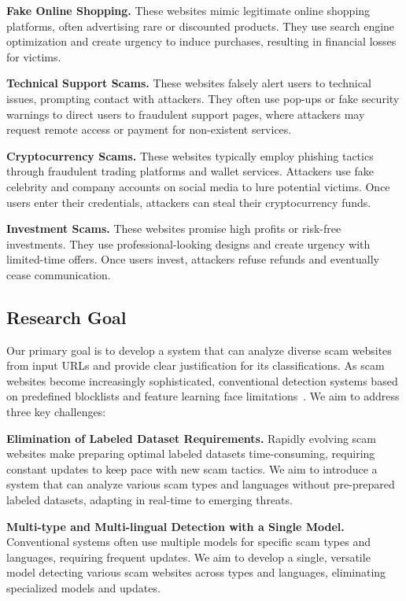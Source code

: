 \documentclass[runningheads]{llncs}
\begin{document}
\noindent\textbf{Fake Online Shopping.}
These websites mimic legitimate online shopping platforms, often advertising rare or discounted products.
They use search engine optimization and create urgency to induce purchases, resulting in financial losses for victims.

\noindent\textbf{Technical Support Scams.}
These websites falsely alert users to technical issues, prompting contact with attackers.
They often use pop-ups or fake security warnings to direct users to fraudulent support pages, where attackers may request remote access or payment for non-existent services.

\noindent\textbf{Cryptocurrency Scams.}
These websites typically employ phishing tactics through fraudulent trading platforms and wallet services.
Attackers use fake celebrity and company accounts on social media to lure potential victims.
Once users enter their credentials, attackers can steal their cryptocurrency funds.

\noindent\textbf{Investment Scams.}
These websites promise high profits or risk-free investments.
They use professional-looking designs and create urgency with limited-time offers.
Once users invest, attackers refuse refunds and eventually cease communication.

\subsection{Research Goal}
Our primary goal is to develop a system that can analyze diverse scam websites from input URLs and provide clear justification for its classifications.
As scam websites become increasingly sophisticated, conventional detection systems based on predefined blocklists and feature learning face limitations~\cite{DBLP:conf/ndss/LiYN23,DBLP:conf/www/SrinivasanKMANA18,DBLP:conf/sp/BitaabCOLWAWBSD23,DBLP:conf/acsac/KotziasRPSB23}.
We aim to address three key challenges:

\noindent\textbf{Elimination of Labeled Dataset Requirements.}
Rapidly evolving scam websites make preparing optimal labeled datasets time-consuming, requiring constant updates to keep pace with new scam tactics.
We aim to introduce a system that can analyze various scam types and languages without pre-prepared labeled datasets, adapting in real-time to emerging threats.

\noindent\textbf{Multi-type and Multi-lingual Detection with a Single Model.}
Conventional systems often use multiple models for specific scam types and languages, requiring frequent updates.
We aim to develop a single, versatile model detecting various scam websites across types and languages, eliminating specialized models and updates.
\end{document}
